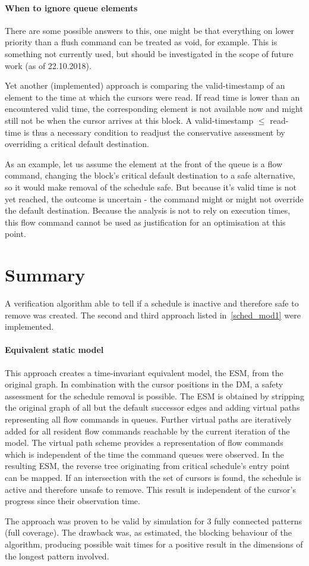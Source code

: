 \paragraph{When to ignore queue elements}
There are some possible answers to this, one might be that everything on lower priority than a flush command can be treated as void, for example. This is something not currently used, but should be investigated in the scope of future work (as of 22.10.2018).
\par
Yet another (implemented) approach is comparing the valid-timestamp of an element to the time at which the cursors were read.
If read time is lower than an encountered valid time, the corresponding element is not available now and might still not be when the cursor arrives at this block.
A valid-timestamp $\le$ read-time is thus a necessary condition to readjust the conservative assessment by overriding a critical default destination.
\par
As an example, let us assume the element at the front of the queue is a flow command, changing the block's critical default destination to a safe alternative, so it would make removal of the schedule safe.
But because it's valid time is not yet reached, the outcome is uncertain - the command might or might not override the default destination. Because the analysis is not to rely on execution times, this flow command cannot be used as justification for an optimisation at this point.


\section{Summary}
A verification algorithm able to tell if a schedule is inactive and therefore safe to remove was created. The second and third approach listed in~\ref{sched_mod1} were implemented.
\paragraph{Equivalent static model} This approach creates a time-invariant equivalent model, the ESM, from the original graph. In combination with the cursor positions in the DM, a safety assessment for the schedule removal is possible. The ESM is obtained by stripping the original graph of all but the default successor edges and adding virtual paths representing all flow commands in queues. Further virtual paths are iteratively added for all resident flow commands reachable by the current iteration of the model. The virtual path scheme provides a representation of flow commands which is independent of the time the command queues were observed.
In the resulting ESM, the reverse tree originating from critical schedule's entry point can be mapped. If an intersection with the set of cursors
is found, the schedule is active and therefore unsafe to remove.
This result is independent of the cursor's progress since their observation time.
\par The approach was proven to be valid by simulation for 3 fully  connected patterns (full coverage). The drawback was, as estimated, the blocking behaviour of the algorithm, producing possible wait times for a positive result in the dimensions of the longest pattern involved.

